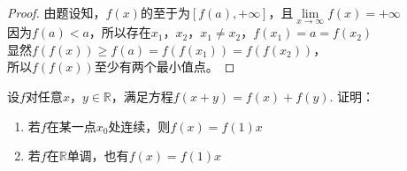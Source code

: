 \begin{proof}
    
    由题设知，$f(x)$的至于为$[f(a),+\infty]$，且$\lim\limits_{x \to \infty}{f(x)} = +\infty$\\
    因为$f(a)<a$，所以存在$x_1$，$x_2$，$x_1 \neq x_2$，$f(x_1) = a = f(x_2)$\\
    显然$f(f(x))\geq f(a) = f(f(x_1)) = f(f(x_2))$，\\
    所以$f(f(x))$至少有两个最小值点。

\end{proof}

\begin{proposition}[Cauthy方程]
    
    设$f$对任意$x$，$y \in \mathbb{R}$，满足方程$f(x+y) = f(x) + f(y)$. 证明：

    \begin{enumerate}

        \item 若$f$在某一点$x_0$处连续，则$f(x) = f(1)x$
        
        \item 若$f$在$\mathbb{R}$单调，也有$f(x) = f(1)x$
        
    \end{enumerate}

\end{proposition}

